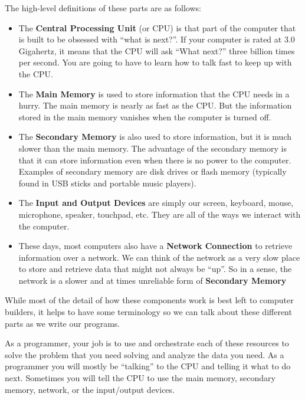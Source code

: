 \documentclass[11pt]{book}
\begin{document}
The high-level definitions of these parts are as follows:

\begin{itemize}

\item The {\bf Central Processing Unit} (or CPU) is 
that part of the computer that is built to be obsessed 
with ``what is next?''.  If your computer is rated
at 3.0 Gigahertz, it means that the CPU will ask ``What next?''
three billion times per second.  You are going to have to 
learn how to talk fast to keep up with the CPU.

\item The {\bf Main Memory} is used to store information
that the CPU needs in a hurry.  The main memory is nearly as 
fast as the CPU.  But the information stored in the main
memory vanishes when the computer is turned off.

\item The {\bf Secondary Memory} is also used to store
information, but it is much slower than the main memory.
The advantage of the secondary memory is that it can
store information even when there is no power to the
computer.  Examples of secondary memory are disk drives
or flash memory (typically found in USB sticks and portable
music players).

\item The {\bf Input and Output Devices} are simply our
screen, keyboard, mouse, microphone, speaker, touchpad, etc.  
They are all of the ways we interact with the computer.

\item These days, most computers also have a
{\bf Network Connection} to retrieve information over a network.
We can think of the network as a very slow place to store and
retrieve data that might not always be ``up''.  So in a sense,
the network is a slower and at times unreliable form of
{\bf Secondary Memory}

\end{itemize}

While most of the detail of how these components work is best left 
to computer builders, it helps to have some terminology
so we can talk about these different parts as we write our programs.

As a programmer, your job is to use and orchestrate 
each of these resources to solve the problem that you need solving
and analyze the data you need.  As a programmer you will 
mostly be ``talking'' to the CPU and telling it what to 
do next.  Sometimes you will tell the CPU to use the main memory,
secondary memory, network, or the input/output devices.
\end{document}
